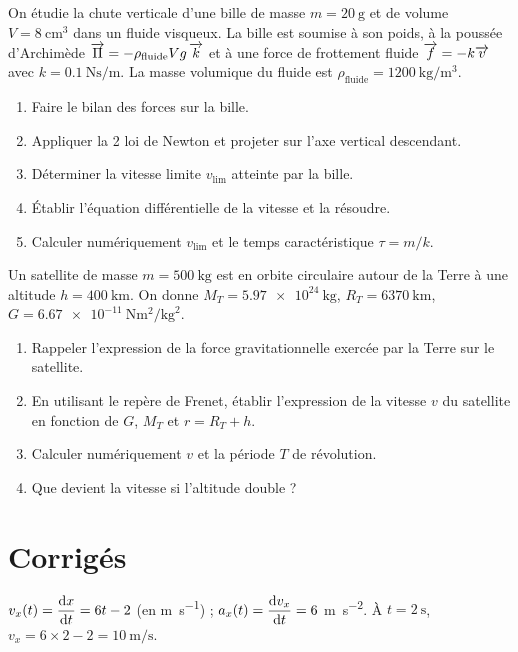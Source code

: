On étudie la chute verticale d’une bille de masse $m=\SI{20}{\gram}$ et de volume $V=\SI{8}{\centi\metre\cubed}$ dans un fluide visqueux. La bille est soumise à son poids, à la poussée d’Archimède $\overrightarrow{\Pi}=-\rho_{\text{fluide}} V g\,\overrightarrow{k}$ et à une force de frottement fluide $\overrightarrow{f}=-k\overrightarrow{v}$ avec $k=\SI{0.1}{\newton\second\per\metre}$. La masse volumique du fluide est $\rho_{\text{fluide}}=\SI{1200}{\kilogram\per\metre\cubed}$.

\begin{enumerate}[label=\arabic*)]
\item Faire le bilan des forces sur la bille.
\item Appliquer la 2\ieme{} loi de Newton et projeter sur l’axe vertical descendant.
\item Déterminer la vitesse limite $v_{\text{lim}}$ atteinte par la bille.
\item Établir l’équation différentielle de la vitesse et la résoudre.
\item Calculer numériquement $v_{\text{lim}}$ et le temps caractéristique $\tau=m/k$.
\end{enumerate}

Un satellite de masse $m=\SI{500}{\kilogram}$ est en orbite circulaire autour de la Terre à une altitude $h=\SI{400}{\kilo\metre}$. On donne $M_T=\SI{5.97e24}{\kilogram}$, $R_T=\SI{6370}{\kilo\metre}$, $G=\SI{6.67e-11}{\newton\metre\squared\per\kilogram\squared}$.

\begin{enumerate}[label=\arabic*)]
\item Rappeler l’expression de la force gravitationnelle exercée par la Terre sur le satellite.
\item En utilisant le repère de Frenet, établir l’expression de la vitesse $v$ du satellite en fonction de $G$, $M_T$ et $r=R_T+h$.
\item Calculer numériquement $v$ et la période $T$ de révolution.
\item Que devient la vitesse si l’altitude double ?
\end{enumerate}

\section{Corrigés}

$v_x(t)=\dfrac{\mathrm{d}x}{\mathrm{d}t}=6t-2$ (en \si{\metre\per\second}) ; $a_x(t)=\dfrac{\mathrm{d}v_x}{\mathrm{d}t}=6$ \si{\metre\per\second\squared}. À $t=\SI{2}{\second}$, $v_x=6\times2-2=\SI{10}{\metre\per\second}$.

